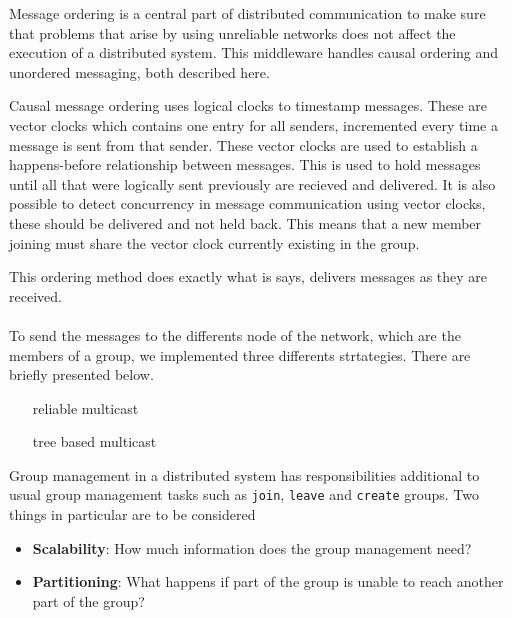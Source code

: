 
	Message ordering is a central part of distributed communication to make sure that problems that arise by using unreliable networks does not affect the execution of a distributed system.
	This middleware handles causal ordering and unordered messaging, both described here.

		Causal message ordering uses logical clocks to timestamp messages.
		These are vector clocks which contains one entry for all senders, incremented every time a message is sent from that sender.
		These vector clocks are used to establish a happens-before relationship between messages.
		This is used to hold messages until all that were logically sent previously are recieved and delivered.
		It is also possible to detect concurrency in message communication using vector clocks, these should be delivered and not held back.
		This means that a new member joining must share the vector clock currently existing in the group.

		This ordering method does exactly what is says, delivers messages as they are received.


\paragraph{}{
    To send the messages to the differents node of the network,
 which are the members of a group, we implemented three differents
 strtategies. There are briefly presented below.
}

\begin{itemize}
     This strategy only send messages
        to the member of the view...
    \item[reliable multicast]
    \item[tree based multicast]


\end{itemize}

	Group management in a distributed system has responsibilities additional to usual group management tasks such as \texttt{join}, \texttt{leave} and \texttt{create} groups.
	Two things in particular are to be considered
	\begin{itemize}
		\item \textbf{Scalability}: How much information does the group management need?
		\item \textbf{Partitioning}: What happens if part of the group is unable to reach another part of the group?
	\end{itemize}

